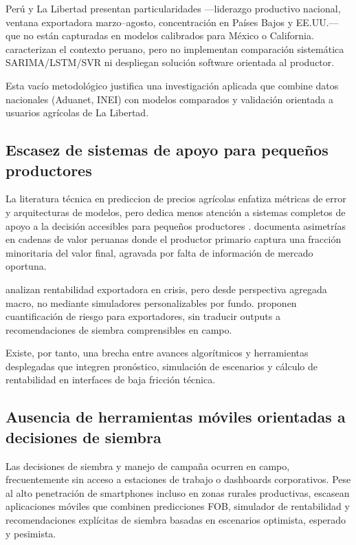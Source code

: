Per\'u y La Libertad presentan particularidades ---liderazgo productivo nacional, ventana exportadora marzo--agosto, concentraci\'on en Pa\'ises Bajos y EE.UU.--- que no est\'an capturadas en modelos calibrados para M\'exico o California. \citet{VitteryFlores2023} caracterizan el contexto peruano, pero no implementan comparaci\'on sistem\'atica SARIMA/LSTM/SVR ni despliegan soluci\'on software orientada al productor.

Esta vac\'io metodol\'ogico justifica una investigaci\'on aplicada que combine datos nacionales (Aduanet, INEI) con modelos comparados y validaci\'on orientada a usuarios agr\'icolas de La Libertad.

\subsection{Escasez de sistemas de apoyo para peque\~nos productores}

La literatura t\'ecnica en prediccion de precios agr\'icolas enfatiza m\'etricas de error y arquitecturas de modelos, pero dedica menos atenci\'on a sistemas completos de apoyo a la decisi\'on accesibles para peque\~nos productores \citep{VargasCordova2025}. \citet{VargasCordova2025} documenta asimetr\'ias en cadenas de valor peruanas donde el productor primario captura una fracci\'on minoritaria del valor final, agravada por falta de informaci\'on de mercado oportuna.

\citet{Capunay2025} analizan rentabilidad exportadora en crisis, pero desde perspectiva agregada macro, no mediante simuladores personalizables por fundo. \citet{Velasquez2025} proponen cuantificaci\'on de riesgo para exportadores, sin traducir outputs a recomendaciones de siembra comprensibles en campo.

Existe, por tanto, una brecha entre avances algor\'itmicos y herramientas desplegadas que integren pron\'ostico, simulaci\'on de escenarios y c\'alculo de rentabilidad en interfaces de baja fricci\'on t\'ecnica.

\subsection{Ausencia de herramientas m\'oviles orientadas a decisiones de siembra}

Las decisiones de siembra y manejo de campa\~na ocurren en campo, frecuentemente sin acceso a estaciones de trabajo o dashboards corporativos. Pese al alto penetraci\'on de smartphones incluso en zonas rurales productivas, escasean aplicaciones m\'oviles que combinen predicciones FOB, simulador de rentabilidad y recomendaciones expl\'icitas de siembra basadas en escenarios optimista, esperado y pesimista.

